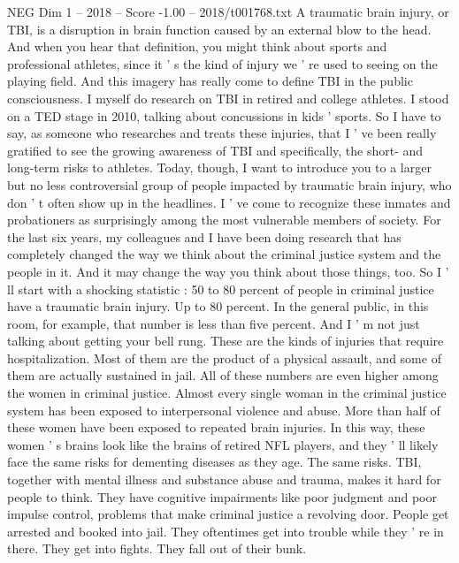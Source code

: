 \begin{textsample}{NEG Dim 1 – 2018 – Score -1.00 – 2018/t001768.txt}  \label{ex:f1_neg_015}
A traumatic brain injury, or TBI, is a disruption in brain function caused by an external blow to the head.
And when you hear that definition, you might think about sports and professional athletes, since it ' s the kind of injury we ' re used to seeing on the playing field.
And this imagery has really come to define TBI in the public consciousness.
I myself do research on TBI in retired and college athletes.
I stood on a TED stage in 2010, talking about concussions in kids ' sports.
So I have to say, as someone who researches and treats these injuries, that I ' ve been really gratified to see the growing awareness of TBI and specifically, the short- and long-term risks to athletes.
Today, though, I want to introduce you to a larger but no less controversial group of people impacted by traumatic brain injury, who don ' t often show up in the headlines.
I ' ve come to recognize these inmates and probationers as surprisingly among the most vulnerable members of society.
For the last six years, my colleagues and I have been doing research that has completely changed the way we think about the criminal justice system and the people in it.
And it may change the way you think about those things, too.
So I ' ll start with a shocking statistic : 50 to 80 percent of people in criminal justice have a traumatic brain injury.
Up to 80 percent.
In the general public, in this room, for example, that number is less than five percent.
And I ' m not just talking about getting your bell rung.
These are the kinds of injuries that require hospitalization.
Most of them are the product of a physical assault, and some of them are actually sustained in jail.
All of these numbers are even higher among the women in criminal justice.
Almost every single woman in the criminal justice system has been exposed to interpersonal violence and abuse.
More than half of these women have been exposed to repeated brain injuries.
In this way, these women ' s brains look like the brains of retired NFL players, and they ' ll likely face the same risks for dementing diseases as they age.
The same risks.
TBI, together with mental illness and substance abuse and trauma, makes it hard for people to think.
They have cognitive impairments like poor judgment and poor impulse control, problems that make criminal justice a revolving door.
People get arrested and booked into jail.
They oftentimes get into trouble while they ' re in there.
They get into fights.
They fall out of their bunk.

\end{textsample}
